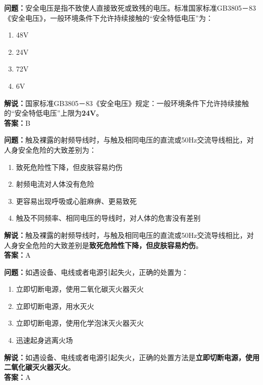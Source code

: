 \bigskip



\noindent\textbf{问题：}安全电压是指不致使人直接致死或致残的电压。标准国家标准GB3805－83《安全电压》，一般环境条件下允许持续接触的“安全特低电压”为：
\begin{enumerate}[label=\Alph*), leftmargin=3em]
	\item 48V
	\item 24V
	\item 72V
	\item 6V
\end{enumerate}
\noindent\textbf{解说：}国家标准GB3805－83《安全电压》规定：一般环境条件下允许持续接触的“安全特低电压”上限为\textbf{24V}。\\\noindent\textbf{答案：}B



\bigskip



\noindent\textbf{问题：}触及裸露的射频导线时，与触及相同电压的直流或50Hz交流导线相比，对人身安全危险的大致差别为：
\begin{enumerate}[label=\Alph*), leftmargin=3em]
	\item 致死危险性下降，但皮肤容易灼伤
	\item 射频电流对人体没有危险
	\item 更容易出现呼吸或心脏麻痹、更易致死
	\item 触及不同频率、相同电压的导线时，对人体的危害没有差别
\end{enumerate}
\noindent\textbf{解说：}触及裸露的射频导线时，与触及相同电压的直流或50Hz交流导线相比，对人身安全危险的大致差别是\textbf{致死危险性下降，但皮肤容易灼伤}。\\\noindent\textbf{答案：}A


\bigskip



\noindent\textbf{问题：}如遇设备、电线或者电源引起失火，正确的处置为：
\begin{enumerate}[label=\Alph*), leftmargin=3em]
	\item 立即切断电源，使用二氧化碳灭火器灭火
	\item 立即切断电源，用水灭火
	\item 立即切断电源，使用化学泡沫灭火器灭火
	\item 迅速起身逃离火场
\end{enumerate}
\noindent\textbf{解说：}如遇设备、电线或者电源引起失火，正确的处置方法是\textbf{立即切断电源，使用二氧化碳灭火器灭火}。\\\noindent\textbf{答案：}A


